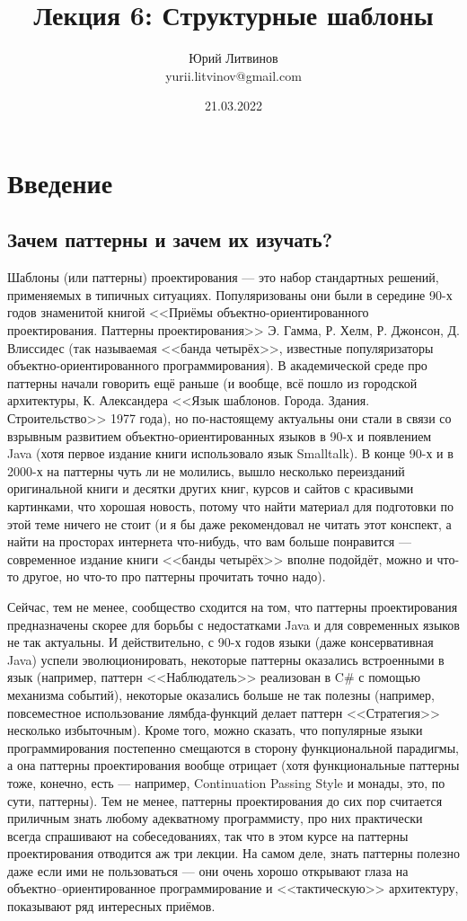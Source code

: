 \documentclass[a5paper]{article}
\title{Лекция 6: Структурные шаблоны}
\author{Юрий Литвинов\\\small{yurii.litvinov@gmail.com}}
\date{21.03.2022}
\begin{document}
\maketitle
\thispagestyle{empty}

\section{Введение}

\subsection{Зачем паттерны и зачем их изучать?}

Шаблоны (или паттерны) проектирования --- это набор стандартных решений, применяемых в типичных ситуациях. Популяризованы они были в середине 90-х годов знаменитой книгой <<Приёмы объектно-ориентированного проектирования. Паттерны проектирования>> Э. Гамма, Р. Хелм, Р. Джонсон, Д. Влиссидес (так называемая <<банда четырёх>>, известные популяризаторы объектно-ориентированного программирования). В академической среде про паттерны начали говорить ещё раньше (и вообще, всё пошло из городской архитектуры, К. Александера <<Язык шаблонов. Города. Здания. Строительство>> 1977 года), но по-настоящему актуальны они стали в связи со взрывным развитием объектно-ориентированных языков в 90-х и появлением Java (хотя первое издание книги использовало язык Smalltalk). В конце 90-х и в 2000-х на паттерны чуть ли не молились, вышло несколько переизданий оригинальной книги и десятки других книг, курсов и сайтов с красивыми картинками, что хорошая новость, потому что найти материал для подготовки по этой теме ничего не стоит (и я бы даже рекомендовал не читать этот конспект, а найти на просторах интернета что-нибудь, что вам больше понравится --- современное издание книги <<банды четырёх>> вполне подойдёт, можно и что-то другое, но что-то про паттерны прочитать точно надо). 

Сейчас, тем не менее, сообщество сходится на том, что паттерны проектирования предназначены скорее для борьбы с недостатками Java и для современных языков не так актуальны. И действительно, с 90-х годов языки (даже консервативная Java) успели эволюционировать, некоторые паттерны оказались встроенными в язык (например, паттерн <<Наблюдатель>> реализован в C\# с помощью механизма событий), некоторые оказались больше не так полезны (например, повсеместное использование лямбда-функций делает паттерн <<Стратегия>> несколько избыточным). Кроме того, можно сказать, что популярные языки программирования постепенно смещаются в сторону функциональной парадигмы, а она паттерны проектирования вообще отрицает (хотя функциональные паттерны тоже, конечно, есть --- например, Continuation Passing Style и монады, это, по сути, паттерны). Тем не менее, паттерны проектирования до сих пор считается приличным знать любому адекватному программисту, про них практически всегда спрашивают на собеседованиях, так что в этом курсе на паттерны проектирования отводится аж три лекции. На самом деле, знать паттерны полезно даже если ими не пользоваться --- они очень хорошо открывают глаза на объектно--ориентированное программирование и <<тактическую>> архитектуру, показывают ряд интересных приёмов.
\end{document}
